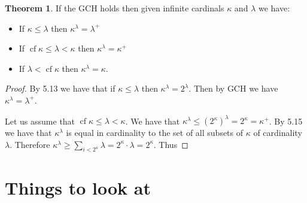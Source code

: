 \documentclass{article}
\theoremstyle{definition}
\newtheorem{thm}{Theorem}[section]
\DeclareMathOperator{\cf}{cf}
\begin{document}
\begin{thm}
    If the GCH holds then given infinite cardinals $\kappa$ and $\lambda$ we have:
    \begin{itemize}
        \item If $\kappa \le \lambda$ then $\kappa^\lambda = \lambda^+$
        \item If $\cf \kappa \le \lambda < \kappa$ then $\kappa^\lambda = \kappa^+$
        \item If $\lambda < \cf \kappa$ then $\kappa^\lambda = \kappa$.
    \end{itemize}
\end{thm}

\begin{proof}
    By 5.13 we have that if $\kappa \le \lambda$ then $\kappa^\lambda = 2^\lambda$. Then by GCH we have $\kappa^\lambda = \lambda^+$.

    Let us assume that $\cf \kappa \le \lambda < \kappa$. We have that $\kappa^\lambda \le (2^\kappa)^\lambda = 2^\kappa = \kappa^+$. By 5.15 we have that $\kappa^\lambda$ is equal in cardinality to the set of all subsets of $\kappa$ of cardinality $\lambda$. Therefore $\kappa^\lambda \ge \sum_{i < 2^{\kappa}} \lambda = 2^{\kappa} \cdot \lambda = 2^{\kappa}$. Thus 
\end{proof}

\newpage

\section{Things to look at}
\end{document}
